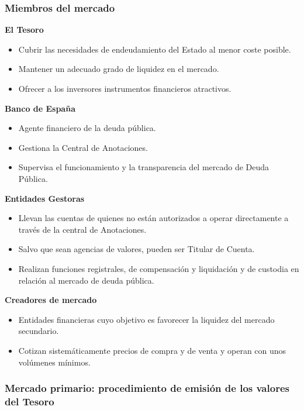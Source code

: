 \documentclass[
  letterpaper,
  DIV=11,
  numbers=noendperiod]{scrreprt}
\begin{document}
\begin{tcolorbox}
\subsubsection{Miembros del mercado}\label{miembros-del-mercado}

\textbf{El Tesoro}

\begin{itemize}
\item
  Cubrir las necesidades de endeudamiento del Estado al menor coste
  posible.
\item
  Mantener un adecuado grado de liquidez en el mercado.
\item
  Ofrecer a los inversores instrumentos financieros atractivos.
\end{itemize}

\textbf{Banco de España}

\begin{itemize}
\item
  Agente financiero de la deuda pública.
\item
  Gestiona la Central de Anotaciones.
\item
  Supervisa el funcionamiento y la transparencia del mercado de Deuda
  Pública.
\end{itemize}

\textbf{Entidades Gestoras}

\begin{itemize}
\item
  Llevan las cuentas de quienes no están autorizados a operar
  directamente a través de la central de Anotaciones.
\item
  Salvo que sean agencias de valores, pueden ser Titular de Cuenta.
\item
  Realizan funciones registrales, de compensación y liquidación y de
  custodia en relación al mercado de deuda pública.
\end{itemize}

\textbf{Creadores de mercado}

\begin{itemize}
\item
  Entidades financieras cuyo objetivo es favorecer la liquidez del
  mercado secundario.
\item
  Cotizan sistemáticamente precios de compra y de venta y operan con
  unos volúmenes mínimos.
\end{itemize}

\subsubsection{Mercado primario: procedimiento de emisión de los valores
del
Tesoro}\label{mercado-primario-procedimiento-de-emisiuxf3n-de-los-valores-del-tesoro}


\end{tcolorbox}
\end{document}
